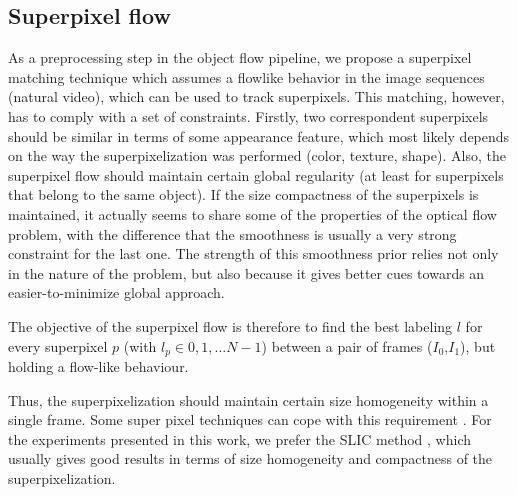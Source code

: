 \subsection{Superpixel flow}
\label{sec:suppix}

As a preprocessing step in the object flow pipeline, we propose a superpixel matching technique which assumes a flowlike behavior in the image 
sequences (natural video), which can be used to track superpixels. 
This matching, however, has to comply with a set of constraints. 
Firstly, two correspondent superpixels should be similar in terms of some appearance
feature, which most likely depends on the way the superpixelization was performed (color, texture,
shape). Also, the superpixel flow  should maintain certain global regularity (at least for
superpixels that belong to the same object). %
If the size compactness of the superpixels is maintained,  it actually seems to 
share some of the properties of the optical flow problem, with the difference that the
smoothness is usually a very strong constraint for the last one. 
The strength of this smoothness prior relies not only in the nature of the problem, but also
because it gives better cues towards an easier-to-minimize global approach.

The objective of the superpixel flow is therefore to find the best labeling $l$ for every superpixel $p$
(with $l_p \in {0,1,...N-1}$) between a pair of frames ($I_{0}$,$I_{1}$), but holding a flow-like behaviour.

Thus, the superpixelization should maintain certain size homogeneity within a single frame. Some super
pixel techniques can cope with this requirement \cite{c9}\cite{c10}. For the experiments presented 
in this work, we prefer the SLIC method \cite{c9}, which usually gives
good results in terms of size homogeneity and compactness of the superpixelization. 

